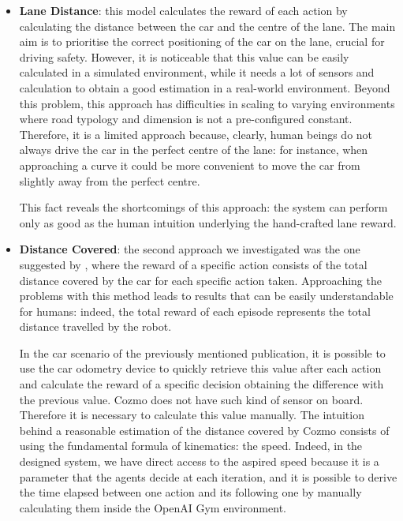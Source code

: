 \begin{itemize}
	\item \textbf{Lane Distance}: this model calculates the reward of each action by calculating the distance between the car and the centre of the lane. The main aim is to prioritise the correct positioning of the car on the lane, crucial for driving safety. However, it is noticeable that this value can be easily calculated in a simulated environment, while it needs a lot of sensors and calculation to obtain a good estimation in a real-world environment. Beyond this problem, this approach has difficulties in scaling to varying environments where road typology and dimension is not a pre-configured constant. Therefore, it is a limited approach because, clearly, human beings do not always drive the car in the perfect centre of the lane: for instance, when approaching a curve it could be more convenient to move the car from slightly away from the perfect centre.

	      This fact reveals the shortcomings of this approach: the system can perform only as good as the human intuition underlying the hand-crafted lane reward.

	\item \textbf{Distance Covered}: the second approach we investigated was the one suggested by \cite{kendall2018learning,kendall2019learning}, where the reward of a specific action consists of the total distance covered by the car for each specific action taken. Approaching the problems with this method leads to results that can be easily understandable for humans: indeed, the total reward of each episode represents the total distance travelled by the robot.

	      In the car scenario of the previously mentioned publication, it is possible to use the car odometry device to quickly retrieve this value after each action and calculate the reward of a specific decision obtaining the difference with the previous value. Cozmo does not have such kind of sensor on board. Therefore it is necessary to calculate this value manually. The intuition behind a reasonable estimation of the distance covered by Cozmo consists of using the fundamental formula of kinematics: the speed. Indeed, in the designed system, we have direct access to the aspired speed because it is a parameter that the agents decide at each iteration, and it is possible to derive the time elapsed between one action and its following one by manually calculating them inside the OpenAI Gym environment.


\end{itemize}
